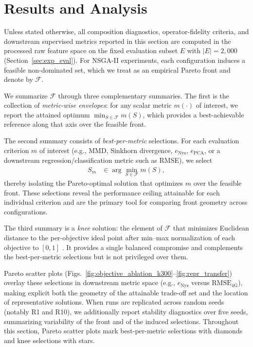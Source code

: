 \documentclass[10pt,journal]{IEEEtran}
\newcommand{\1}{\mathbf{1}}
\theoremstyle{ieeethm}
\begin{document}
\section{Results and Analysis}
\label{sec:results_analysis}

Unless stated otherwise, all composition diagnostics, operator-fidelity criteria, and downstream supervised metrics
reported in this section are computed in the processed raw feature space on the fixed evaluation subset
$E$ with $|E|=2{,}000$ (Section~\ref{sec:exp_eval}). For NSGA-II experiments, each configuration induces a feasible
non-dominated set, which we treat as an empirical Pareto front and denote by $\mathcal{F}$.

We summarize $\mathcal{F}$ through three complementary summaries. The first is the collection of
\emph{metric-wise envelopes}: for any scalar metric $m(\cdot)$ of interest, we report the attained optimum
$\min_{S\in\mathcal{F}} m(S)$, which provides a best-achievable reference along that axis over the feasible front.

The second summary consists of \emph{best-per-metric} selections. For each evaluation criterion $m$ of interest (e.g., MMD, Sinkhorn divergence, $e_{\mathrm{Nys}}$, $e_{\mathrm{PCA}}$, or a downstream regression/classification metric such as RMSE), we select
\begin{align*}
S_m &\in \arg\min_{S\in\mathcal{F}} m(S),
\end{align*}
thereby isolating the Pareto-optimal solution that optimizes $m$ over the feasible front. These selections reveal the performance ceiling attainable for each individual criterion and are the primary tool for comparing front geometry across configurations.

The third summary is a \emph{knee} solution: the element of $\mathcal{F}$ that minimizes Euclidean
distance to the per-objective ideal point after min--max normalization of each objective to
$[0,1]$ \cite{deb2001moea}. It provides a single balanced compromise and complements the
best-per-metric selections but is not privileged over them.

Pareto scatter plots (Figs.~\ref{fig:objective_ablation_k300}--\ref{fig:repr_transfer}) overlay these
selections in downstream metric space (e.g., $e_{\mathrm{Nys}}$ versus $\mathrm{RMSE}_{4\mathrm{G}}$),
making explicit both the geometry of the attainable trade-off set and the location of representative solutions.
When runs are replicated across random seeds (notably R1 and R10), we additionally report stability diagnostics over
five seeds, summarizing variability of the front and of the induced selections.
Throughout this section, Pareto scatter plots mark best-per-metric selections with diamonds
and knee selections with stars.
\end{document}
